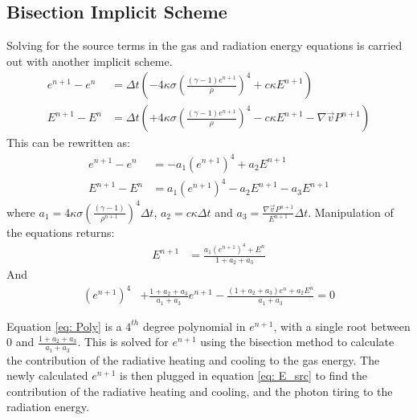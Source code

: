 \subsection{Bisection Implicit Scheme} \label{subsection: BIS}
Solving for the source terms in the gas and radiation energy equations is carried out with another implicit scheme. 
\begin{align}
e^{n+1} - e^n &= \Delta t \left( -4\kappa \sigma \left(\frac{(\gamma - 1)e^{n+1}}{\rho}\right)^4 + c \kappa E^{n+1} \right) \\ 
E^{n+1} - E^n &= \Delta t \left( +4\kappa \sigma \left(\frac{(\gamma - 1)e^{n+1}}{\rho}\right)^4 - c \kappa E^{n+1} -\nabla \vec{v} P^{n+1} \right)
\end{align} 
This can be rewritten as:
\begin{align}
e^{n+1} - e^n &= -a_1 \left( e^{n+1}\right)^4 + a_2 E^{n+1}  \\ 
E^{n+1} - E^n &= a_1 \left( e^{n+1} \right)^4 - a_2 E^{n+1} - a_3 E^{n+1} 
\end{align}
where $a_1 = 4\kappa \sigma \left(\frac{(\gamma - 1)}{\rho^{n+1}}\right)^4 \Delta t$, $a_2 = c \kappa \Delta t$ and $a_3 = \frac{\nabla \vec{v} P^{n+1} }{E^{n+1}} \Delta t$. Manipulation of the equations returns:
\begin{align}
E^{n+1} &= \frac{a_1 \left( e^{n+1} \right)^4 + E^n}{1 + a_2 + a_3} \label{eq: E_src}
\end{align}
And
\begin{align}
\left( e^{n+1} \right)^4 &+ \frac{1 + a_2 + a_3}{a_1 + a_3}e^{n+1} -  \frac{(1 + a_2 + a_3)e^n + a_2 E^n}{a_1 + a_3} = 0 \label{eq: Poly}
\end{align}

Equation \eqref{eq: Poly} is a $4^{th}$ degree polynomial in $e^{n+1}$, with a single root between $0$ and $\frac{1 + a_2 + a_3}{a_1 + a_3}$. This is solved for $e^{n+1}$ using the bisection method to calculate the contribution of the radiative heating and cooling to the gas energy. The newly calculated $e^{n+1}$ is then plugged in equation \eqref{eq: E_src} to find the contribution of the radiative heating and cooling, and the photon tiring to the radiation energy.

